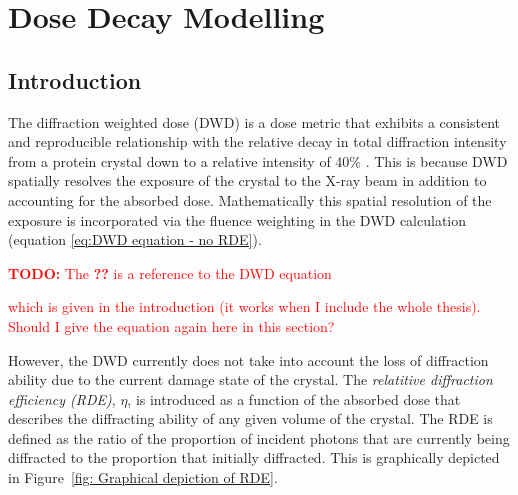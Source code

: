 \chapter{Dose Decay Modelling}
\label{chap:Dose Decay Modelling}

\section{Introduction}
\label{sec:Introduction - Dose Decay Modelling}

The diffraction weighted dose (DWD) is a dose metric that exhibits a consistent and reproducible relationship with the relative decay in total diffraction intensity from a protein crystal down to a relative intensity of 40\% \cite{zeldin2013dwd}.
This is because DWD spatially resolves the exposure of the crystal to the X-ray beam in addition to accounting for the absorbed dose.
Mathematically this spatial resolution of the exposure is incorporated via the fluence weighting in the DWD calculation (equation \ref{eq:DWD equation - no RDE}).
\textcolor{red}{
    \begin{myenumerate}
        \item \hypertarget{todo:include DWD equation again}{\textbf{TODO:} The \textbf{??} is a reference to the DWD equation}
        which is given in the introduction (it works when I include the whole thesis). Should I give the equation again here in this section?
    \end{myenumerate}
}
However, the DWD currently does not take into account the loss of diffraction ability due to the current damage state of the crystal.
The \textit{relatitive diffraction efficiency (RDE)}, $\eta$, is introduced as a function of the absorbed dose that describes the diffracting ability of any given volume of the crystal.
The RDE is defined as the ratio of the proportion of incident photons that are currently being diffracted to the proportion that initially diffracted.
This is graphically depicted in Figure~\ref{fig: Graphical depiction of RDE}.
